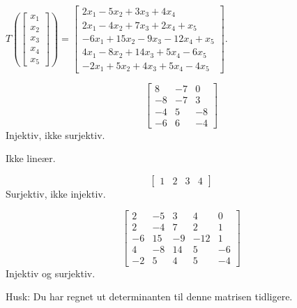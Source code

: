 \begin{oppgave}
\begin{punkt}
\end{punkt}

\begin{punkt}
$T(\begin{bmatrix}
x_1\\
x_2\\
x_3\\
x_4\\
x_5
\end{bmatrix})=\begin{bmatrix}
2x_1-5x_2+3x_3+4x_4\\
2x_1-4x_2+7x_3+2x_4+x_5\\
-6x_1+15x_2-9x_3-12x_4+x_5\\
4x_1-8x_2+14x_3+5x_4-6x_5\\
-2x_1+5x_2+4x_3+5x_4-4x_5
\end{bmatrix}.$

\end{punkt}


\end{oppgave}

\begin{losning}


\begin{punkt}
$$\begin{bmatrix}
8 & -7 & 0\\
-8 & -7 & 3\\
-4 & 5 & -8\\
-6 & 6 & -4
\end{bmatrix}$$
Injektiv, ikke surjektiv.
\end{punkt}

\begin{punkt}
Ikke lineær.
\end{punkt}

\begin{punkt}
$$\begin{bmatrix}
1 & 2 & 3 & 4
\end{bmatrix}$$
Surjektiv, ikke injektiv.
\end{punkt}

\begin{punkt}
$$
\begin{bmatrix}
2 & -5 & 3 & 4 & 0 \\
2 & -4 & 7 & 2 & 1 \\
-6 & 15 & -9 & -12 & 1 \\
4 & -8 & 14 & 5 & -6 \\
-2 & 5 & 4 & 5 & -4
\end{bmatrix}
$$
Injektiv og surjektiv.

\noindent 
Husk: Du har regnet ut determinanten til denne matrisen tidligere.

\end{punkt}

\end{losning}


